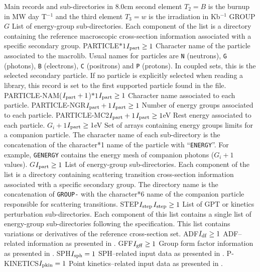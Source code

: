 \begin{DescriptionEnregistrement}{Main records and sub-directories in }{8.0cm}
{   second element $T_{2}=B$ is the burnup in MW day T$^{-1}$ and the third element $T_{3}=w$ is the 
   irradiation in Kb$^{-1}$}
\DirlEnr
  {GROUP}{$G$}
  {List of energy-group sub-directories. Each component of the list is a directory containing
  the reference macroscopic cross-section information associated with a specific secondary group.}
\OptCharEnr
  {PARTICLE}{$*1$}{$I_{\rm part}\ge 1$} 
  {Character name of the particle associated to the macrolib. Usual names for
  particles are {\tt N} (neutrons), {\tt G} (photons), {\tt B} (electrons),
  {\tt C} (positrons) and {\tt P} (protons). In coupled sets, this is the
  selected secondary particle. If no particle is explicitly selected when
  reading a  library, this record is set to the first supported
  particle found in the file.}
\OptCharEnr
  {PARTICLE-NAM}{($I_{\rm part}+1$)$*1$}{$I_{\rm part}\ge 1$} 
  {Character name associated to each particle.}
\OptIntEnr
  {PARTICLE-NGR}{$I_{\rm part}+1$}{$I_{\rm part}\ge 1$}
  {Number of energy groups associated to each particle.}
\OptRealEnr
  {PARTICLE-MC2}{$I_{\rm part}+1$}{$I_{\rm part}\ge 1$}{eV}
  {Rest energy associated to each particle.}
\OptRealVar
  {}{$G_i+1$}{$I_{\rm part}\ge 1$}{eV}
  {Set of arrays containing energy groups limits for a companion particle. The character name
  of each sub-directory is the concatenation of the character*1 name of the particle with ``{\tt ENERGY}''.
  For example, {\tt GENERGY} contains the energy mesh of companion photons ($G_i+1$ values).}
\OptDirlVar
  {}{$G$}{$I_{\rm part}\ge 1$} 
  {List of energy-group sub-directories. Each component of the list is a directory containing
  scattering transition cross-section information associated with a specific secondary group.
  The directory  name is the concatenation of {\tt GROUP-} with the character*6
  name of the companion particle responsible for scattering transitions.}
\OptDirlEnr
  {STEP}{$I_{\rm step}$}{$I_{\rm step}\ge 1$} 
  {List of GPT or kinetics perturbation sub-directories. Each component of
  this list contains a single 
  list of energy-group sub-directories following the  specification.
  This  list contains variations or derivatives of the reference cross-section set.}
\OptDirEnr
  {ADF}{$I_{\rm df} \ge 1$}
  {ADF--related information as presented in .}
\OptDirEnr
  {GFF}{$I_{\rm gff} \ge 1$}
  {Group form factor information as presented in .}
\OptDirEnr
  {SPH}{$I_{\rm sph} = 1$}
  {SPH--related input data as presented in .}
\OptDirEnr
  {P-KINETICS}{$I_{\rm pkin} = 1$}
  {Point kinetics--related input data as presented in .}
\end{DescriptionEnregistrement}

